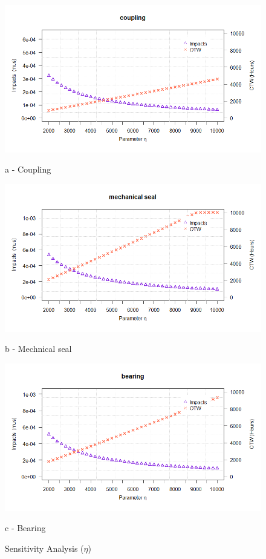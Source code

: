 \begin{figure}[!htb]
	\begin{minipage}[b]{0.5\linewidth}
		\centering
		\includegraphics[width=\textwidth]{figures/ch05_fig_saeta_coupling}
		\caption*{a - Coupling}
	\end{minipage}
	\hspace{0.05cm}
	\begin{minipage}[b]{0.5\linewidth}
		\centering
		\includegraphics[width=\textwidth]{figures/ch05_fig_saeta_mechseal}
		\caption*{b - Mechnical seal}
	\end{minipage}
	\hspace{0.05cm}
	\begin{minipage}[b]{0.5\linewidth}
		\centering
		\includegraphics[width=\textwidth]{figures/ch05_fig_saeta_bearing}
		\caption*{c - Bearing}
	\end{minipage}
	\caption{Sensitivity Analysis ($\eta$)}
	\label{ch05_fig_sa_eta}
\end{figure}